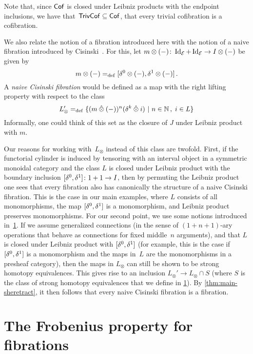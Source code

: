 \documentclass[reqno,10pt,a4paper,oneside,draft]{amsart}
\begin{document}
Note that, since $\mathsf{Cof}$ is  closed under Leibniz products with the endpoint inclusions, we have that~$\mathsf{TrivCof} \subseteq \mathsf{Cof}$, \ie
that every trivial cofibration is a cofibration. 
\begin{remark} \label{cisinski-remark}
We also relate the notion of a fibration introduced here with the notion of a naive fibration introduced by Cisinski~\cite{cisinski-asterisque}.
For this, let $m \otimes (-)  \colon \operatorname{Id}_{\mathcal{E}} + \operatorname{Id}_{\mathcal{E}} \to I \otimes (-)$ be given by
\[
  m \otimes (-) =_{\operatorname{def}} [\delta^0 \otimes (-), \delta^1 \otimes (-)] \, .
\]
A \emph{naive Cisinski fibration} would be defined as a map with the right lifting property with respect to the class
\[
L_\otimes' =_{\operatorname{def}} \{ (m \mathbin{\hat{\otimes}} (-))^n ( \delta^k \mathbin{\hat{\otimes}} i ) \ | \ n \in \mathbb{N} \, , \;  i \in L \} 
\]
Informally, one could think of this set as the closure of $J$ under Leibniz product with $m$. 

Our reasons for working with~$L_\otimes$ instead of this class are twofold. First, if the functorial cylinder is induced by tensoring with an interval object in a symmetric monoidal category and the class $L$ is closed under Leibniz product with the boundary inclusion $[\delta^0, \delta^1] \colon 1 + 1 \to I$, then by permuting the Leibniz product one sees that every fibration also has canonically the structure of a  naive Cisinski fibration.
This is the case in our main examples, where $L$ consists of all monomorphisms, the map $[\delta^0, \delta^1]$ is a monomorphism, and Leibniz product preserves monomorphisms. For our second point, we use some notions introduced in~\cref{sec:frobprop}.
If we assume generalized connections (in the sense of $(1+n+1)$-ary operations that behave as connections for fixed middle~$n$ arguments), and that $L$ is closed under Leibniz product with $[\delta^0, \delta^1]$ (for example, this is the case if $[\delta^0, \delta^1]$ is a monomorphism and the maps in~$L$ are the monomorphisms in a presheaf category), then the maps in $L_\otimes$ can still be shown to be strong homotopy equivalences. This gives rise to an inclusion $L_\otimes' \to L_\otimes \cap S$  (where $S$ is the class of strong homotopy equivalences that we define in \cref{sec:frobprop}). By \cref{thm:main-sheretract}, it then follows that every naive Cisinski fibration is a fibration.
\end{remark}


\section{The Frobenius property for fibrations}
\label{sec:frobprop}
\end{document}
